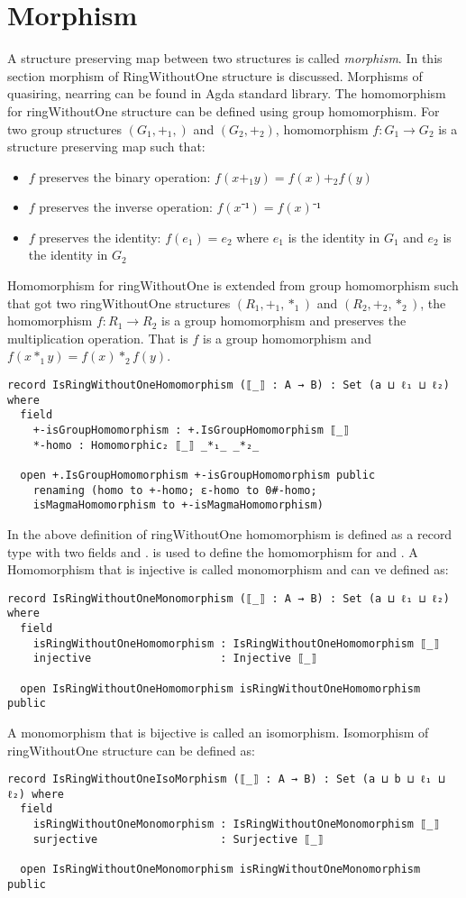 \section{Morphism} 
A structure preserving map between two structures is called \textit{morphism}.
In this section morphism of RingWithoutOne structure is discussed. Morphisms of
quasiring, nearring can be found in Agda standard library. The homomorphism for
ringWithoutOne structure can be defined using group homomorphism. For two group
structures $(G_1,+_1,)$ and $(G_2,+_2)$, homomorphism $f:G_1 \rightarrow G_2$ is
a structure preserving map such that:
\begin{itemize}
  \item $f$ preserves the binary operation: $f(x +_1 y) = f(x) +_2 f(y)$
  \item $f$ preserves the inverse operation: $f(x⁻¹) = f(x)⁻¹$
  \item $f$ preserves the identity: $f(e_1) = e_2$ where $e_1$ is the identity
  in $G_1$ and $e_2$ is the identity in $G_2$
\end{itemize}
Homomorphism for ringWithoutOne is extended from group homomorphism such that
got two ringWithoutOne structures $(R_1,+_1,*_1)$ and $(R_2,+_2,*_2)$, the
homomorphism $f: R_1 \rightarrow R_2$ is a group homomorphism and preserves the
multiplication operation. That is $f$ is a group homomorphism and \(f(x *_1 y) =
f(x) *_2 f(y)\).
\begin{verbatim}
record IsRingWithoutOneHomomorphism (⟦_⟧ : A → B) : Set (a ⊔ ℓ₁ ⊔ ℓ₂) where
  field
    +-isGroupHomomorphism : +.IsGroupHomomorphism ⟦_⟧
    *-homo : Homomorphic₂ ⟦_⟧ _*₁_ _*₂_

  open +.IsGroupHomomorphism +-isGroupHomomorphism public
    renaming (homo to +-homo; ε-homo to 0#-homo;
    isMagmaHomomorphism to +-isMagmaHomomorphism)
\end{verbatim} 
In the above definition of ringWithoutOne homomorphism
 is defined as a record type with two
fields  and . 
is used to define the homomorphism for  and . A
Homomorphism that is injective is called monomorphism and can ve defined as:
\begin{verbatim}
record IsRingWithoutOneMonomorphism (⟦_⟧ : A → B) : Set (a ⊔ ℓ₁ ⊔ ℓ₂) where
  field
    isRingWithoutOneHomomorphism : IsRingWithoutOneHomomorphism ⟦_⟧
    injective                    : Injective ⟦_⟧

  open IsRingWithoutOneHomomorphism isRingWithoutOneHomomorphism public
\end{verbatim}
A monomorphism that is bijective is called an isomorphism. Isomorphism of
ringWithoutOne structure can be defined as:
\begin{verbatim}
record IsRingWithoutOneIsoMorphism (⟦_⟧ : A → B) : Set (a ⊔ b ⊔ ℓ₁ ⊔ ℓ₂) where
  field
    isRingWithoutOneMonomorphism : IsRingWithoutOneMonomorphism ⟦_⟧
    surjective                   : Surjective ⟦_⟧

  open IsRingWithoutOneMonomorphism isRingWithoutOneMonomorphism public
\end{verbatim}
